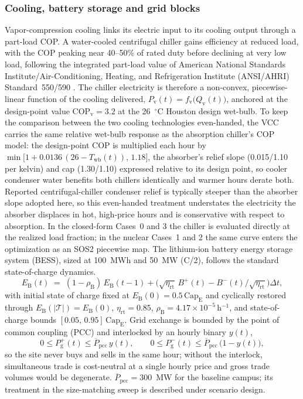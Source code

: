 \documentclass[a4paper,fleqn]{cas-sc}
\begin{document}
\subsubsection{Cooling, battery storage and grid blocks}
Vapor-compression cooling links its electric input to its cooling output through a part-load COP. A water-cooled centrifugal chiller gains efficiency at reduced load, with the COP peaking near 40--50\% of rated duty before declining at very low load, following the integrated part-load value of American National Standards Institute/Air-Conditioning, Heating, and Refrigeration Institute (ANSI/AHRI) Standard~550/590 \citep{ahri2020standard550}. The chiller electricity is therefore a non-convex, piecewise-linear function of the cooling delivered, $P_\mathrm{v}(t)=f_\mathrm{v}\!\big(Q_\mathrm{v}(t)\big)$, anchored at the design-point value $\mathrm{COP}_\mathrm{v}=3.2$ at the 26~$^\circ$C Houston design wet-bulb. To keep the comparison between the two cooling technologies even-handed, the VCC carries the same relative wet-bulb response as the absorption chiller's COP model: the design-point COP is multiplied each hour by $\min\!\big[1+0.0136\,(26-T_\mathrm{wb}(t)),\,1.18\big]$, the absorber's relief slope (0.015/1.10 per kelvin) and cap (1.30/1.10) expressed relative to its design point, so cooler condenser water benefits both chillers identically and warmer hours derate both. Reported centrifugal-chiller condenser relief \citep{ahri2020standard550} is typically steeper than the absorber slope adopted here, so this even-handed treatment understates the electricity the absorber displaces in hot, high-price hours and is conservative with respect to absorption. In the closed-form Cases~0 and 3 the chiller is evaluated directly at the realized load fraction; in the nuclear Cases~1 and 2 the same curve enters the optimization as an SOS2 piecewise map. The lithium-ion battery energy storage system (BESS), sized at 100~MWh and 50~MW (C/2), follows the standard state-of-charge dynamics.
\begin{equation}
\label{eq:bess_soc}
E_\mathrm{B}(t) \;=\; (1-\rho_\mathrm{B})\,E_\mathrm{B}(t-1) + \big(\sqrt{\eta_\mathrm{rt}}\,B^{+}(t) - B^{-}(t)/\sqrt{\eta_\mathrm{rt}}\big)\Delta t,
\end{equation}
with initial state of charge fixed at $E_\mathrm{B}(0)=0.5\,\mathrm{Cap}_\mathrm{E}$ and cyclically restored through $E_\mathrm{B}(|\mathcal{T}|) = E_\mathrm{B}(0)$, $\eta_\mathrm{rt}=0.85$, $\rho_\mathrm{B}=4.17\times10^{-5}$\,h$^{-1}$, and state-of-charge bounds $[0.05,\, 0.95]\,\mathrm{Cap}_\mathrm{E}$. Grid exchange is bounded by the point of common coupling (PCC) and interlocked by an hourly binary $y(t)$,
\begin{equation}
\label{eq:grid_interlock}
0 \le P_\mathrm{g}^{+}(t) \le \overline{P}_\mathrm{pcc}\, y(t), \qquad
0 \le P_\mathrm{g}^{-}(t) \le \overline{P}_\mathrm{pcc}\, \big(1 - y(t)\big),
\end{equation}
so the site never buys and sells in the same hour; without the interlock, simultaneous trade is cost-neutral at a single hourly price and gross trade volumes would be degenerate. $\overline{P}_\mathrm{pcc}=300$~MW for the baseline campus; its treatment in the size-matching sweep is described under scenario design.
\end{document}

